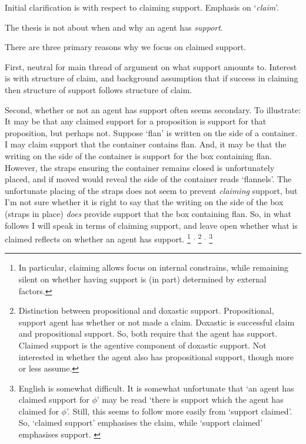 \begin{note}
  Initial clarification is with respect to claiming support.
  Emphasis on `\emph{claim}'.

  The thesis is not about when and why an agent has \emph{support}.

  There are three primary reasons why we focus on claimed support.

  First, neutral for main thread of argument on what support amounts to.
  Interest is with structure of claim, and background assumption that if success in claiming then structure of support follows structure of claim.

  Second, whether or not an agent has support often seems secondary.
  To illustrate:
  It may be that any claimed support for a proposition is support for that proposition, but perhaps not.
  Suppose `flan' is written on the side of a container.
  I may claim support that the container contains flan.
  And, it may be that the writing on the side of the container is support for the box containing flan.
  However, the straps ensuring the container remains closed is unfortunately placed, and if moved would reveal the side of the container reads `flannels'.
  The unfortunate placing of the straps does not seem to prevent \emph{claiming} support, but I'm not sure whether it is right to say that the writing on the side of the box (straps in place) \emph{does} provide support that the box containing flan.
  So, in what follows I will speak in terms of claiming support, and leave open whether what is claimed reflects on whether an agent has support.\nolinebreak
  \footnote{
    In particular, claiming allows focus on internal constrains, while remaining silent on whether having support is (in part) determined by external factors.
  }
  \(^{,}\)\nolinebreak
  \footnote{
    Distinction between propositional and doxastic support.
    Propositional, support agent has whether or not made a claim.
    Doxastic is successful claim and propositional support.
    So, both require that the agent has support.
    Claimed support is the agentive component of doxastic support.
    Not interested in whether the agent also has propositional support, though more or less assume.
  }
  \(^{,}\)\nolinebreak
  \footnote{
    {
      \color{red}
      English is somewhat difficult.
      It is somewhat unfortunate that `an agent has claimed support for \(\phi\)' may be read `there is support which the agent has claimed for \(\phi\)'.
      Still, this seems to follow more easily from `support claimed'.
      So, `claimed support' emphasises the claim, while `support claimed' emphasises support.
    }
  }


\end{note}
